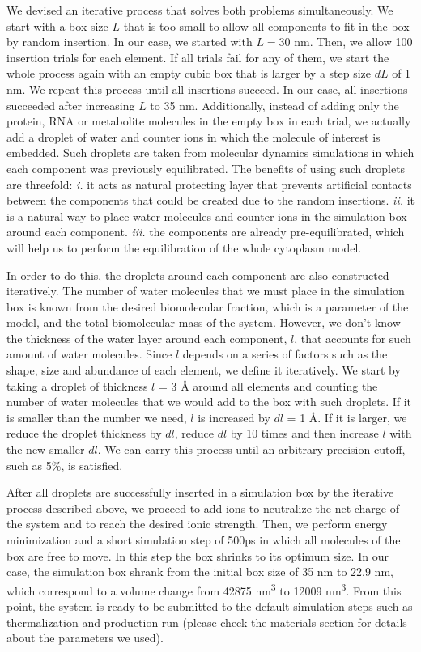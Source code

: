 \documentclass[journal=jacsat,manuscript=article]{achemso}
\begin{document}
We devised an iterative process that solves both problems simultaneously. We start with a box size $L$ that is too small to allow all components to fit in the box by random insertion. In our case, we started with $L = 30$ nm. Then, we allow 100 insertion trials for each element. If all trials fail for any of them, we start the whole process again with an empty cubic box that is larger by a step size $dL$ of 1 nm. We repeat this process until all insertions succeed. In our case, all insertions succeeded after increasing $L$ to 35 nm. Additionally, instead of adding only the protein, RNA or metabolite molecules in the empty box in each trial, we actually add a droplet of water and counter ions in which the molecule of interest is embedded. Such droplets are taken from molecular dynamics simulations in which each component was previously equilibrated. The benefits of using such droplets are threefold: \textit{i.} it acts as natural protecting layer that prevents artificial contacts between the components that could be created due to the random insertions. \textit{ii.} it is a natural way to place water molecules and counter-ions in the simulation box around each component. \textit{iii.} the components are already pre-equilibrated, which will help us to perform the equilibration of the whole cytoplasm model.

In order to do this, the droplets around each component are also constructed iteratively. The number of water molecules that we must place in the simulation box is known from the desired biomolecular fraction, which is a parameter of the model, and the total biomolecular mass of the system. However, we don't know the thickness of the water layer around each component, $l$, that accounts for such amount of water molecules. Since $l$ depends on a series of factors such as the shape, size and abundance of each element, we define it iteratively. We start by taking a droplet of thickness $l$ = 3 \r{A} around all elements and counting the number of water molecules that we would add to the box with such droplets. If it is smaller than the number we need, $l$ is increased by $dl$ = 1 \r{A}. If it is larger, we reduce the droplet thickness by $dl$, reduce $dl$ by 10 times and then increase $l$ with the new smaller $dl$. We can carry this process until an arbitrary precision cutoff, such as 5\%, is satisfied.


After all droplets are successfully inserted in a simulation box by the iterative process described above, we proceed to add ions to neutralize the net charge of the system and to reach the desired ionic strength. Then, we perform energy minimization and a short simulation step of 500ps in which all molecules of the box are free to move. In this step the box shrinks to its optimum size. In our case, the simulation box shrank from the initial box size of 35 nm to 22.9 nm, which correspond to a volume change from 42875 nm\textsuperscript{3} to 12009 nm\textsuperscript{3}. From this point, the system is ready to be submitted to the default simulation steps such as thermalization and production run (please check the materials section for details about the parameters we used).
\end{document}
